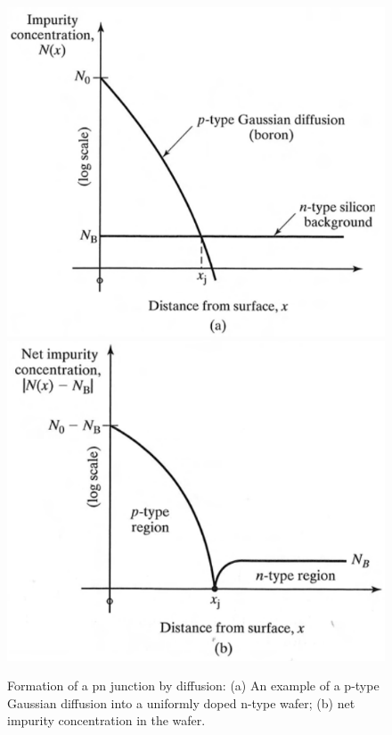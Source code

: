 \begin{figure}[H]
	\centering
	\includegraphics[scale=0.5]{well_formation1.png}
	\includegraphics[scale=0.5]{well_formation2.png}
	\caption{Formation of a pn junction by diffusion: (a) An example of a p-type Gaussian diffusion into a uniformly doped n-type wafer; (b) net impurity concentration in the wafer.}
	\label{junction_formation_plot}
\end{figure}

